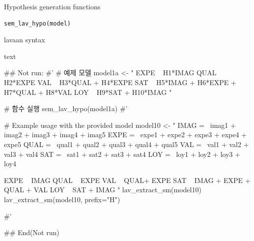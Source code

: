 \documentclass[a4paper]{book}
\begin{document}
%
\begin{Description}
Hypothesis generation functions
\end{Description}
%
\begin{Usage}
\begin{verbatim}
sem_lav_hypo(model)
\end{verbatim}
\end{Usage}
%
\begin{Arguments}
\begin{ldescription}
\item[\code{model}] lavaan syntax
\end{ldescription}
\end{Arguments}
%
\begin{Value}
text
\end{Value}
%
\begin{Examples}
\begin{ExampleCode}

\#\# Not run: 
#'
# 예제 모델
model1a <- "
EXPE ~ H1*IMAG
QUAL ~ H2*EXPE
VAL ~  H3*QUAL + H4*EXPE
SAT ~ H5*IMAG + H6*EXPE + H7*QUAL + H8*VAL
LOY ~ H9*SAT + H10*IMAG
"

# 함수 실행
sem_lav_hypo(model1a)
#'

# Example usage with the provided model
model10 <- "
IMAG =~ imag1 + imag2 + imag3 + imag4 + imag5
EXPE =~ expe1 + expe2 + expe3 + expe4 + expe5
QUAL =~ qual1 + qual2 + qual3 + qual4 + qual5
VAL =~ val1 + val2 + val3 + val4
SAT =~ sat1 + sat2 + sat3 + sat4
LOY =~ loy1 + loy2 + loy3 + loy4

EXPE ~ IMAG
QUAL ~ EXPE
VAL ~  QUAL+ EXPE
SAT ~ IMAG + EXPE + QUAL + VAL
LOY ~ SAT + IMAG
"
lav_extract_sm(model10)%
lav_extract_sm(model10, prefix="H")%



#'

## End(Not run)

\end{ExampleCode}
\end{Examples}
\end{document}

